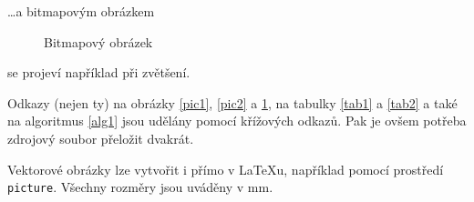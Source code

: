 \documentclass[a4paper,11pt]{article}
\begin{document}
\noindent\ldots a bitmapovým obrázkem

\begin{figure}[h]
\begin{center}
\caption{Bitmapový obrázek}
\label{pic3}
\end{center}
\end{figure}

\noindent se projeví například při zvětšení.

Odkazy (nejen ty) na obrázky \ref{pic1}, \ref{pic2} a \ref{pic3},  na tabulky \ref{tab1} a \ref{tab2} a také na algoritmus \ref{alg1} jsou udělány pomocí křížových odkazů. Pak je ovšem potřeba zdrojový soubor přeložit dvakrát.

Vektorové obrázky lze vytvořit i přímo v \LaTeX u, například pomocí prostředí \textup{\texttt{picture}}. Všechny rozměry jsou uváděny v mm.

\newpage
\end{document}
